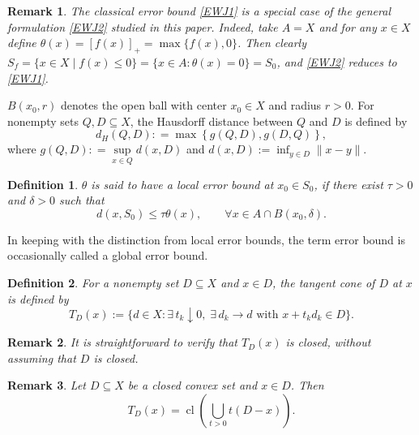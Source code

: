 \documentclass[11pt]{article}
\DeclareMathOperator{\cl}{cl}
\newtheorem{definition}{Definition}[section]
\newtheorem{remark}{Remark}[section]
\begin{document}
\begin{remark}
	The classical error bound \eqref{EWJ1} is a special case of the general formulation \eqref{EWJ2} studied in this paper. 
	Indeed, take \(A = X\) and for any \(x \in X\) define \(\theta(x) = [f(x)]_+ = \max\{f(x), 0\}\). 
	Then clearly \(S_f = \{x \in X \mid f(x) \leq 0\} = \{x \in A : \theta(x) = 0\} = S_0\), and \eqref{EWJ2} reduces to \eqref{EWJ1}.
\end{remark}


$B(x_0,r)$ denotes the open ball with center $x_0 \in X$ and radius $r > 0$. 
For   nonempty sets \(Q, D \subseteq X\),  
the Hausdorff distance between $Q$ and $D$ is defined by
$$d_H \left( {Q,D} \right): = \max \left\{ {g\left( {Q,D} \right),g\left( {D,Q} \right)} \right\},$$
where $g\left( {Q,D} \right): = \mathop {\sup }\limits_{x \in Q} d\left( {x,D} \right)$ and $d(x,D) := \inf_{y \in D} \|x - y\|$.


\begin{definition}
	$\theta$ is said to have a  local error bound at $x_0 \in S_0$, if there exist $\tau > 0$  and $\delta > 0$ such that
	\[
	d(x, S_0) \leq \tau \theta (x), \qquad \forall x \in A \cap B(x_0,\delta).
	\]
	
\end{definition}
In keeping with the distinction from local error bounds, the term error bound is occasionally called a global error bound.




\begin{definition}  
	For a nonempty set $D \subseteq X$ and $x \in D$, the  tangent cone  of  $D$ at  $x$ is defined  by  
	$$T_D(x)  := \bigl\{ d \in X : \exists\, t_k \downarrow 0,\; \exists\, d_k \to d \text{ with } x + t_k d_k \in D \bigr\}.$$
\end{definition}
\begin{remark}  It is straightforward to verify that $T_D(x)$ is closed, without assuming that $D$ is closed.   \end{remark}


\begin{remark} \label{RtDFxl}    \cite{AE1984}    Let  $D \subseteq X$ be a closed convex set  and $x \in D$.  Then  $$  T_D(x) = \cl \left( \bigcup_{t > 0} t(D - x) \right). $$
\end{remark}
\end{document}
